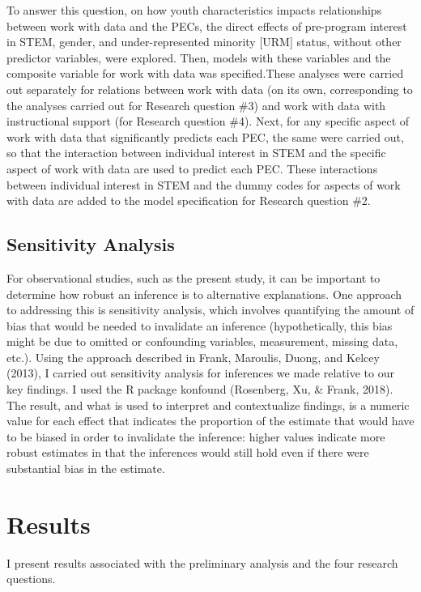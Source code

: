 \documentclass[]{book}
\theoremstyle{definition}
\theoremstyle{definition}
\theoremstyle{definition}
\theoremstyle{remark}
\begin{document}
To answer this question, on how youth characteristics impacts
relationships between work with data and the PECs, the direct effects of
pre-program interest in STEM, gender, and under-represented minority
{[}URM{]} status, without other predictor variables, were explored.
Then, models with these variables and the composite variable for work
with data was specified.These analyses were carried out separately for
relations between work with data (on its own, corresponding to the
analyses carried out for Research question \#3) and work with data with
instructional support (for Research question \#4). Next, for any
specific aspect of work with data that significantly predicts each PEC,
the same were carried out, so that the interaction between individual
interest in STEM and the specific aspect of work with data are used to
predict each PEC. These interactions between individual interest in STEM
and the dummy codes for aspects of work with data are added to the model
specification for Research question \#2.

\section{Sensitivity Analysis}\label{sensitivity-analysis}

For observational studies, such as the present study, it can be
important to determine how robust an inference is to alternative
explanations. One approach to addressing this is sensitivity analysis,
which involves quantifying the amount of bias that would be needed to
invalidate an inference (hypothetically, this bias might be due to
omitted or confounding variables, measurement, missing data, etc.).
Using the approach described in Frank, Maroulis, Duong, and Kelcey
(2013), I carried out sensitivity analysis for inferences we made
relative to our key findings. I used the R package konfound (Rosenberg,
Xu, \& Frank, 2018). The result, and what is used to interpret and
contextualize findings, is a numeric value for each effect that
indicates the proportion of the estimate that would have to be biased in
order to invalidate the inference: higher values indicate more robust
estimates in that the inferences would still hold even if there were
substantial bias in the estimate.

\chapter{Results}\label{results}

I present results associated with the preliminary analysis and the four
research questions.
\end{document}
